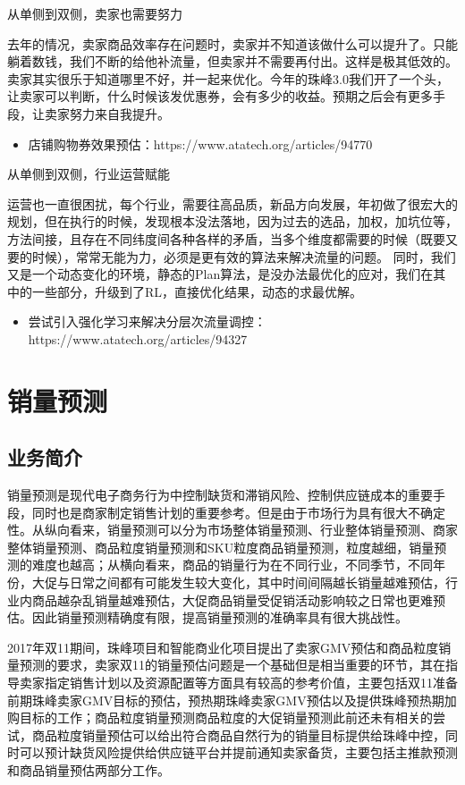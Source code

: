 从单侧到双侧，卖家也需要努力

去年的情况，卖家商品效率存在问题时，卖家并不知道该做什么可以提升了。只能躺着数钱，我们不断的给他补流量，但卖家并不需要再付出。这样是极其低效的。卖家其实很乐于知道哪里不好，并一起来优化。今年的珠峰3.0我们开了一个头，让卖家可以判断，什么时候该发优惠券，会有多少的收益。预期之后会有更多手段，让卖家努力来自我提升。
\begin{itemize}
\item 店铺购物券效果预估：https://www.atatech.org/articles/94770
\end{itemize}

从单侧到双侧，行业运营赋能

运营也一直很困扰，每个行业，需要往高品质，新品方向发展，年初做了很宏大的规划，但在执行的时候，发现根本没法落地，因为过去的选品，加权，加坑位等，方法间接，且存在不同纬度间各种各样的矛盾，当多个维度都需要的时候（既要又要的时候），常常无能为力，必须是更有效的算法来解决流量的问题。
同时，我们又是一个动态变化的环境，静态的Plan算法，是没办法最优化的应对，我们在其中的一些部分，升级到了RL，直接优化结果，动态的求最优解。
\begin{itemize}
\item 尝试引入强化学习来解决分层次流量调控：https://www.atatech.org/articles/94327
\end{itemize}


\section{销量预测}


\subsection{业务简介}

销量预测是现代电子商务行为中控制缺货和滞销风险、控制供应链成本的重要手段，同时也是商家制定销售计划的重要参考。但是由于市场行为具有很大不确定性。从纵向看来，销量预测可以分为市场整体销量预测、行业整体销量预测、商家整体销量预测、商品粒度销量预测和SKU粒度商品销量预测，粒度越细，销量预测的难度也越高；从横向看来，商品的销量行为在不同行业，不同季节，不同年份，大促与日常之间都有可能发生较大变化，其中时间间隔越长销量越难预估，行业内商品越杂乱销量越难预估，大促商品销量受促销活动影响较之日常也更难预估。因此销量预测精确度有限，提高销量预测的准确率具有很大挑战性。

2017年双11期间，珠峰项目和智能商业化项目提出了卖家GMV预估和商品粒度销量预测的要求，卖家双11的销量预估问题是一个基础但是相当重要的环节，其在指导卖家指定销售计划以及资源配置等方面具有较高的参考价值，主要包括双11准备前期珠峰卖家GMV目标的预估，预热期珠峰卖家GMV预估以及提供珠峰预热期加购目标的工作；商品粒度销量预测商品粒度的大促销量预测此前还未有相关的尝试，商品粒度销量预估可以给出符合商品自然行为的销量目标提供给珠峰中控，同时可以预计缺货风险提供给供应链平台并提前通知卖家备货，主要包括主推款预测和商品销量预估两部分工作。

